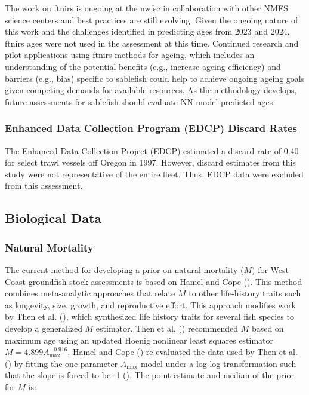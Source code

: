 \documentclass[
  english,
]{article}
\begin{document}
The work on \gls{ftnirs} is ongoing at the \gls{nwfsc} in collaboration
with other NMFS science centers and best practices are still evolving.
Given the ongoing nature of this work and the challenges identified in
predicting ages from 2023 and 2024, \gls{ftnirs} ages were not used in
the assessment at this time. Continued research and pilot applications
using \gls{ftnirs} methods for ageing, which includes an understanding
of the potential benefits (e.g., increase ageing efficiency) and
barriers (e.g., bias) specific to sablefish could help to achieve
ongoing ageing goals given competing demands for available resources. As
the methodology develops, future assessments for sablefish should
evaluate NN model-predicted ages.

\subsubsection{Enhanced Data Collection Program (EDCP) Discard
Rates}\label{enhanced-data-collection-program-edcp-discard-rates}

The Enhanced Data Collection Project (EDCP) estimated a discard rate of
0.40 for select trawl vessels off Oregon in 1997. However, discard
estimates from this study were not representative of the entire fleet.
Thus, EDCP data were excluded from this assessment.

\subsection{Biological Data}\label{biological-data}

\subsubsection{Natural Mortality}\label{m}

The current method for developing a prior on natural mortality (\(M\))
for West Coast groundfish stock assessments is based on Hamel and Cope
(). This method combines
meta-analytic approaches that relate \(M\) to other life-history traits
such as longevity, size, growth, and reproductive effort. This approach
modifies work by Then et al.
(), which synthesized life
history traits for several fish species to develop a generalized \(M\)
estimator. Then et al. ()
recommended \(M\) based on maximum age using an updated Hoenig nonlinear
least squares estimator \(M = 4.899A^{-0.916}_{\text{max}}\). Hamel and
Cope () re-evaluated the data
used by Then et al. () by
fitting the one-parameter \(A_{\text{max}}\) model under a log-log
transformation such that the slope is forced to be -1
(). The point
estimate and median of the prior for \(M\) is:
\end{document}
